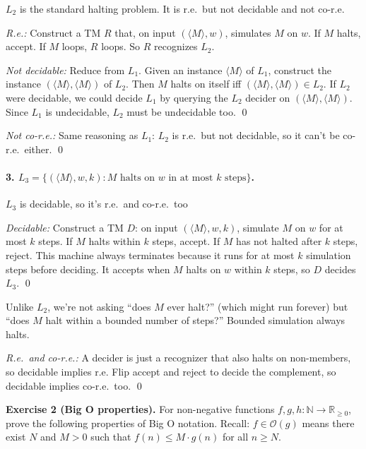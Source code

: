 \documentclass{article}
\theoremstyle{theorem}
\theoremstyle{definition}
\theoremstyle{remark}
\begin{document}
$L_2$ is the standard halting problem. It is r.e.\ but not decidable and not co-r.e.

\emph{R.e.:} Construct a TM $R$ that, on input $(\langle M \rangle, w)$, simulates $M$ on $w$. If $M$ halts, accept. If $M$ loops, $R$ loops. So $R$ recognizes $L_2$.

\emph{Not decidable:} Reduce from $L_1$. Given an instance $\langle M \rangle$ of $L_1$, construct the instance $(\langle M \rangle, \langle M \rangle)$ of $L_2$. Then $M$ halts on itself iff $(\langle M \rangle, \langle M \rangle) \in L_2$. If $L_2$ were decidable, we could decide $L_1$ by querying the $L_2$ decider on $(\langle M \rangle, \langle M \rangle)$. Since $L_1$ is undecidable, $L_2$ must be undecidable too. \qed

\emph{Not co-r.e.:} Same reasoning as $L_1$: $L_2$ is r.e.\ but not decidable, so it can't be co-r.e.\ either. \qed

\paragraph{3. $L_3 = \{(\langle M \rangle, w, k) : M \text{ halts on } w \text{ in at most } k \text{ steps}\}$.}

$L_3$ is decidable, so it's r.e.\ and co-r.e.\ too

\emph{Decidable:} Construct a TM $D$: on input $(\langle M \rangle, w, k)$, simulate $M$ on $w$ for at most $k$ steps. If $M$ halts within $k$ steps, accept. If $M$ has not halted after $k$ steps, reject. This machine always terminates because it runs for at most $k$ simulation steps before deciding. It accepts when $M$ halts on $w$ within $k$ steps, so $D$ decides $L_3$. \qed

Unlike $L_2$, we're not asking ``does $M$ ever halt?'' (which might run forever) but ``does $M$ halt within a bounded number of steps?'' Bounded simulation always halts.

\emph{R.e.\ and co-r.e.:} A decider is just a recognizer that also halts on non-members, so decidable implies r.e. Flip accept and reject to decide the complement, so decidable implies co-r.e.\ too. \qed

\bigskip

\textbf{Exercise 2 (Big O properties).}
For non-negative functions $f, g, h \colon \mathbb{N} \to \mathbb{R}_{\geq 0}$, prove the following properties of Big O notation. Recall: $f \in \mathcal{O}(g)$ means there exist $N$ and $M > 0$ such that $f(n) \leq M \cdot g(n)$ for all $n \geq N$.
\end{document}
